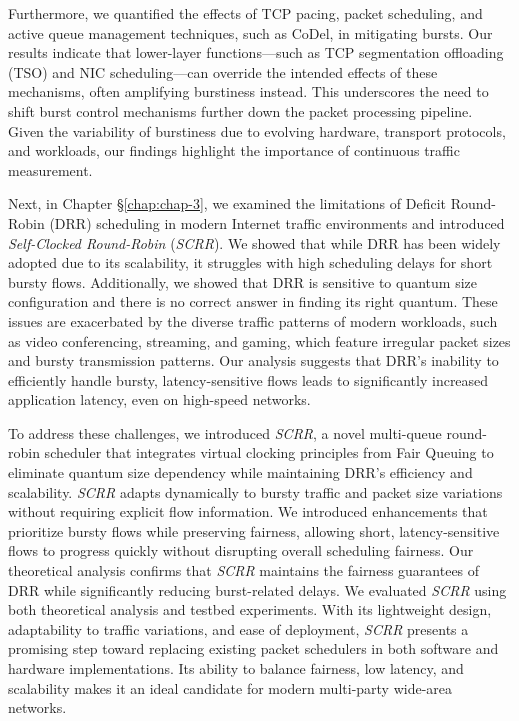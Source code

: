Furthermore, we quantified the effects of TCP pacing, packet scheduling, and active queue management techniques, such as CoDel, in mitigating bursts. Our results indicate that lower-layer functions—such as TCP segmentation offloading (TSO) and NIC scheduling—can override the intended effects of these mechanisms, often amplifying burstiness instead. This underscores the need to shift burst control mechanisms further down the packet processing pipeline. Given the variability of burstiness due to evolving hardware, transport protocols, and workloads, our findings highlight the importance of continuous traffic measurement.

Next, in Chapter \S\ref{chap:chap-3}, we examined the limitations of Deficit Round-Robin (DRR) scheduling in modern Internet traffic environments and introduced \textit{Self-Clocked Round-Robin} (\textit{SCRR}). We showed that while DRR has been widely adopted due to its scalability, it struggles with high scheduling delays for short bursty flows. Additionally, we showed that DRR is sensitive to quantum size configuration and there is no correct answer in finding its right quantum. These issues are exacerbated by the diverse traffic patterns of modern workloads, such as video conferencing, streaming, and gaming, which feature irregular packet sizes and bursty transmission patterns. Our analysis suggests that DRR's inability to efficiently handle bursty, latency-sensitive flows leads to significantly increased application latency, even on high-speed networks.

To address these challenges, we introduced \textit{SCRR}, a novel multi-queue round-robin scheduler that integrates virtual clocking principles from Fair Queuing to eliminate quantum size dependency while maintaining DRR’s efficiency and scalability. \textit{SCRR} adapts dynamically to bursty traffic and packet size variations without requiring explicit flow information. We introduced enhancements that prioritize bursty flows while preserving fairness, allowing short, latency-sensitive flows to progress quickly without disrupting overall scheduling fairness. Our theoretical analysis confirms that \textit{SCRR} maintains the fairness guarantees of DRR while significantly reducing burst-related delays.
We evaluated \textit{SCRR} using both theoretical analysis and testbed experiments. With its lightweight design, adaptability to traffic variations, and ease of deployment, \textit{SCRR} presents a promising step toward replacing existing packet schedulers in both software and hardware implementations. Its ability to balance fairness, low latency, and scalability makes it an ideal candidate for modern multi-party wide-area networks.


